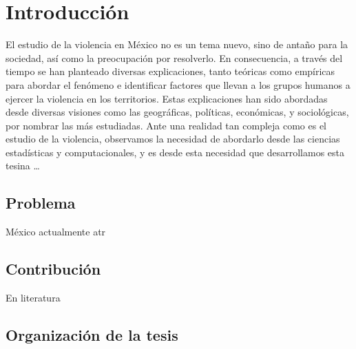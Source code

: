 \chapter{Introducción}

El estudio de la violencia en México no es un tema nuevo, sino de antaño para la sociedad, así como la preocupación por resolverlo. En consecuencia, a través del tiempo se han planteado diversas explicaciones, tanto teóricas como empíricas para abordar el fenómeno e identificar factores que llevan a los grupos humanos a ejercer la violencia en los territorios. Estas explicaciones han sido abordadas desde diversas visiones como  las geográficas, políticas, económicas, y sociológicas, por nombrar las más estudiadas. Ante una realidad tan compleja como es el estudio de la violencia, observamos la necesidad de abordarlo desde las ciencias estadísticas y computacionales, y es desde esta necesidad que desarrollamos esta tesina \ldots


\section{Problema} \label{sec:problem}

México actualmente atr \cite{Kahle2013ggmap}




\section{Contribución} \label{sec:contribution}

En literatura
\section{Organización de la tesis}







